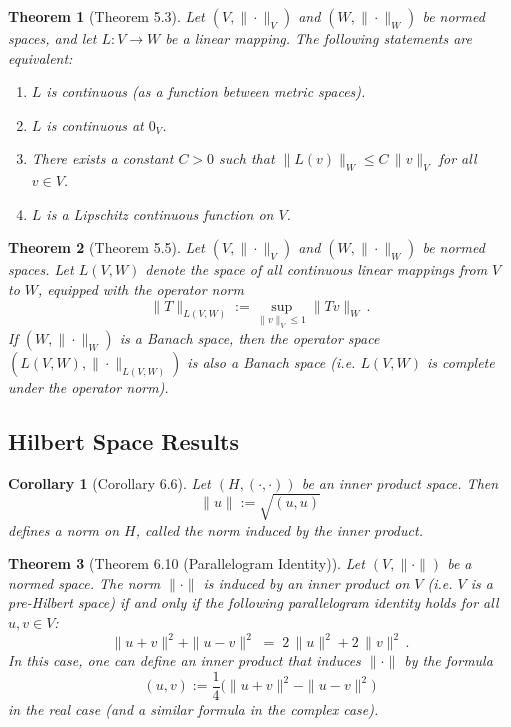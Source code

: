 \documentclass{article}
\theoremstyle{plain}
\newtheorem*{theorem*}{Theorem}
\newtheorem*{corollary*}{Corollary}
\begin{document}
\begin{theorem*}[Theorem 5.3]
Let $(V,\|\cdot\|_V)$ and $(W,\|\cdot\|_W)$ be normed spaces, and let $L: V \to W$ be a linear mapping. The following statements are equivalent:
\begin{enumerate}
\item $L$ is continuous (as a function between metric spaces).
\item $L$ is continuous at $0_V$.
\item There exists a constant $C>0$ such that $\|L(v)\|_W \le C\,\|v\|_V$ for all $v \in V$.
\item $L$ is a Lipschitz continuous function on $V$.
\end{enumerate}
\end{theorem*}

\begin{theorem*}[Theorem 5.5]
Let $(V,\|\cdot\|_V)$ and $(W,\|\cdot\|_W)$ be normed spaces. Let $L(V,W)$ denote the space of all continuous linear mappings from $V$ to $W$, equipped with the operator norm 
\[ 
\|T\|_{L(V,W)} := \sup_{\|v\|_V \le 1} \|T v\|_W\,.
\] 
If $(W,\|\cdot\|_W)$ is a Banach space, then the operator space $(L(V,W), \|\cdot\|_{L(V,W)})$ is also a Banach space (i.e. $L(V,W)$ is complete under the operator norm). 
\end{theorem*}

\subsection*{Hilbert Space Results}
\begin{corollary*}[Corollary 6.6]
Let $(H, (\cdot,\cdot))$ be an inner product space. Then 
\[
\|u\| := \sqrt{(u,u)} 
\] 
defines a norm on $H$, called the norm induced by the inner product.
\end{corollary*}

\begin{theorem*}[Theorem 6.10 (Parallelogram Identity)]
Let $(V,\|\cdot\|)$ be a normed space. The norm $\|\cdot\|$ is induced by an inner product on $V$ (i.e. $V$ is a pre-Hilbert space) if and only if the following parallelogram identity holds for all $u,v \in V$:
\[
\|u+v\|^2 + \|u-v\|^2 \;=\; 2\,\|u\|^2 + 2\,\|v\|^2\,.
\] 
In this case, one can define an inner product that induces $\|\cdot\|$ by the formula 
\[ 
(u,v) := \frac{1}{4}\Big(\|u+v\|^2 - \|u-v\|^2\Big)
\] 
in the real case (and a similar formula in the complex case).
\end{theorem*}
\end{document}
